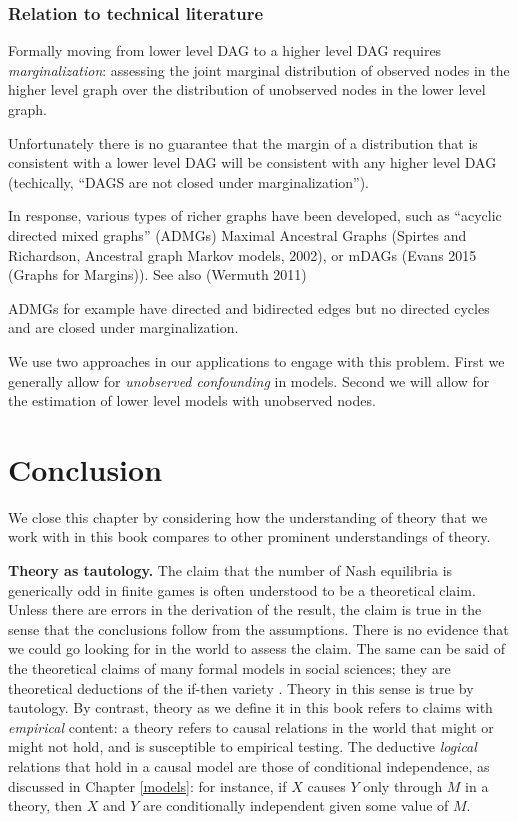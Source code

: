 \documentclass[
  12pt,
]{book}
\begin{document}
\hypertarget{relation-to-technical-literature}{%
\subsubsection{Relation to technical literature}\label{relation-to-technical-literature}}

Formally moving from lower level DAG to a higher level DAG requires \emph{marginalization}: assessing the joint marginal distribution of observed nodes in the higher level graph over the distribution of unobserved nodes in the lower level graph.

Unfortunately there is no guarantee that the margin of a distribution that is consistent with a lower level DAG will be consistent with any higher level DAG (techically, ``DAGS are not closed under marginalization'').

In response, various types of richer graphs have been developed, such as ``acyclic directed mixed graphs'' (ADMGs) Maximal Ancestral Graphs (Spirtes and Richardson, Ancestral graph Markov models, 2002), or mDAGs (Evans 2015 (Graphs for Margins)). See also (Wermuth 2011)

ADMGs for example have directed and bidirected edges but no directed cycles and are closed under marginalization.

We use two approaches in our applications to engage with this problem. First we generally allow for \emph{unobserved confounding} in models. Second we will allow for the estimation of lower level models with unobserved nodes.

\hypertarget{conclusion}{%
\section{Conclusion}\label{conclusion}}

We close this chapter by considering how the understanding of theory that we work with in this book compares to other prominent understandings of theory.

\textbf{Theory as tautology.} The claim that the number of Nash equilibria is generically odd in finite games is often understood to be a theoretical claim. Unless there are errors in the derivation of the result, the claim is true in the sense that the conclusions follow from the assumptions. There is no evidence that we could go looking for in the world to assess the claim. The same can be said of the theoretical claims of many formal models in social sciences; they are theoretical deductions of the if-then variety \citep{clarke2012model}. Theory in this sense is true by tautology. By contrast, theory as we define it in this book refers to claims with \emph{empirical} content: a theory refers to causal relations in the world that might or might not hold, and is susceptible to empirical testing. The deductive \emph{logical} relations that hold in a causal model are those of conditional independence, as discussed in Chapter \ref{models}: for instance, if \(X\) causes \(Y\) only through \(M\) in a theory, then \(X\) and \(Y\) are conditionally independent given some value of \(M\).
\end{document}
